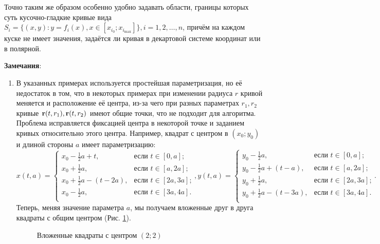 \documentclass[a4paper, 12pt]{article}
\begin{document}
Точно таким же образом особенно удобно задавать области, границы которых суть кусочно-гладкие кривые вида $S_i=\{(x,y): y=f_i(x), x \in [x_{i_0};x_{i_{\max}}]\}, i=1,2,\dots, n$, причём на каждом куске не имеет значения, задаётся ли кривая в декартовой системе координат или в полярной.

{\bf Замечания}:
\begin{enumerate}
  \item В указанных примерах используется простейшая параметризация, но её недостаток в том, что в некоторых примерах при изменении радиуса $r$ кривой меняется и расположение её центра, из-за чего при разных параметрах $r_1,r_2$ кривые ${\bf r}(t,r_1),{\bf r}(t,r_2)$ имеют общие точки, что не подходит для алгоритма.
Проблема исправляется фиксацией центра в некоторой точке и заданием кривых относительно этого центра. Например, квадрат с центром в $(x_0;y_0)$ и длиной стороны $a$ имеет параметризацию:
\[
x(t,a) =
\begin{cases}
x_0-\frac{1}{2}a+t, & \text{если $t \in [0,a]$;} \\
x_0+\frac{1}{2}a, & \text{если $t \in [a,2a]$;} \\
x_0+\frac{1}{2}a-(t-2a), & \text{если $t \in [2a,3a]$;} \\
x_0-\frac{1}{2}a, & \text{если $t \in [3a,4a]$.} \\
\end{cases},
y(t,a) =
\begin{cases}
y_0-\frac{1}{2}a, & \text{если $t \in [0,a]$;} \\
y_0-\frac{1}{2}a+(t-a), & \text{если $t \in [a,2a]$;} \\
y_0+\frac{1}{2}a, & \text{если $t \in [2a,3a]$;} \\
y_0+\frac{1}{2}a-(t-3a), & \text{если $t \in [3a,4a]$.} \\
\end{cases}.
\]
Теперь, меняя значение параметра $a$, мы получаем вложенные друг в друга квадраты с общим центром (Рис. \ref{rects}).
\begin{figure}[h!]
  \noindent{}
  \caption{Вложенные квадраты с центром $(2;2)$}
  \label{rects}
  \end{figure}
  

\end{enumerate}
\end{document}
